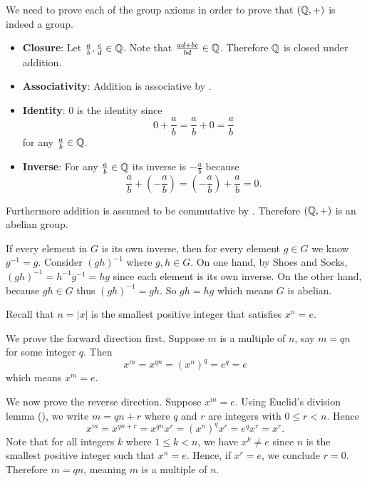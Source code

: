\begin{questions}
    \item We need to prove each of the group axioms in order to prove that $(\mathbb{Q}, +)$ is indeed a group.
    \begin{itemize}
        \item \textbf{Closure}: Let $\frac ab, \frac cd \in \mathbb{Q}$. Note that $\frac{ad+bc}{bd} \in \mathbb{Q}$. Therefore $\mathbb{Q}$ is closed under addition.

        \item \textbf{Associativity}: Addition is associative by .

        \item \textbf{Identity}: 0 is the identity since
        \[
            0 + \frac ab = \frac ab + 0 = \frac ab
        \]
        for any $\frac ab \in \mathbb{Q}$.

        \item \textbf{Inverse}: For any $\frac ab \in \mathbb{Q}$ its inverse is $-\frac ab$ because
        \[
            \frac ab + \left(-\frac ab\right) = \left(-\frac ab\right) + \frac ab = 0.
        \]
    \end{itemize}
    Furthermore addition is assumed to be commutative by . Therefore $(\mathbb{Q}, +)$ is an abelian group.

    \item If every element in $G$ is its own inverse, then for every element $g \in G$ we know $g^{-1} = g$. Consider $(gh)^{-1}$ where $g, h \in G$. On one hand, by Shoes and Socks, $(gh)^{-1} = h^{-1}g^{-1} = hg$ since each element is its own inverse. On the other hand, because $gh \in G$ thus $(gh)^{-1} = gh$. So $gh = hg$ which means $G$ is abelian.

    \item Recall that $n = |x|$ is the smallest positive integer that satisfies $x^n = e$.

    We prove the forward direction first. Suppose $m$ is a multiple of $n$, say $m = qn$ for some integer $q$. Then
    \[
        x^m = x^{qn} = \left(x^n\right)^q = e^q = e
    \]
    which means $x^m = e$.

    We now prove the reverse direction. Suppose $x^m = e$. Using Euclid's division lemma (), we write $m = qn + r$ where $q$ and $r$ are integers with $0 \leq r < n$. Hence
    \[
        x^m = x^{qn + r} = x^{qn}x^r = \left(x^n\right)^qx^r = e^qx^r = x^r.
    \]
    Note that for all integers $k$ where $1 \leq k < n$, we have $x^k \neq e$ since $n$ is the smallest positive integer such that $x^n = e$. Hence, if $x^r = e$, we conclude $r = 0$. Therefore $m = qn$, meaning $m$ is a multiple of $n$.


\end{questions}
